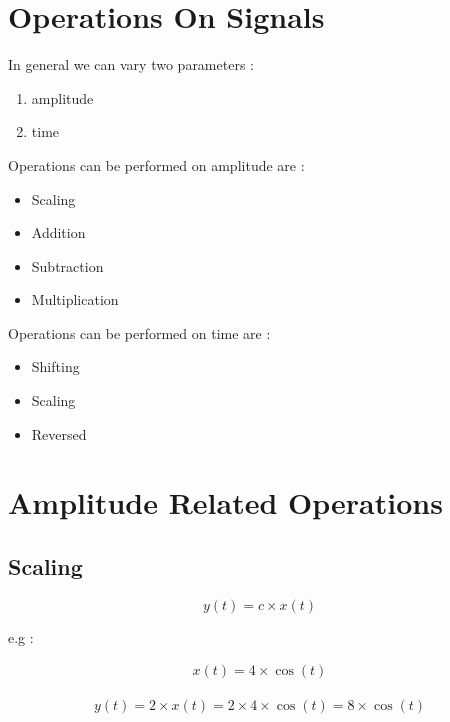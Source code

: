 \documentclass[12pt]{article}
\begin{document}
        


\section{Operations On Signals}


In general we can vary two parameters :

\begin{enumerate}
	\item amplitude
	\item time
\end{enumerate}


\noindent
Operations can be performed on amplitude are :


\begin{itemize}
	\item Scaling
	\item Addition
	\item Subtraction
	\item Multiplication
\end{itemize}


\noindent
Operations can be performed on time are :


\begin{itemize}
	\item Shifting
	\item Scaling
	\item Reversed
\end{itemize}








\section{Amplitude Related Operations}


\subsection{Scaling}


$$
y(t) = c \times x(t)
$$


e.g : 

\begin{align*}
x(t) = 4 \times \cos{(t)}
\end{align*}

\begin{align*}
y(t) = 2 \times x(t) = 2 \times 4 \times \cos{(t)} = 8 \times \cos{(t)}
\end{align*}
\end{document}
